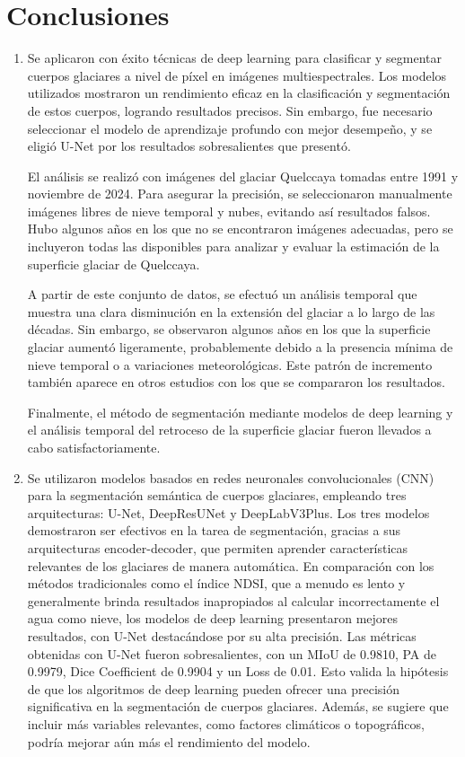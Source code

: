 \chapter{Conclusiones}
\doublespacing

\begin{enumerate}
	\item Se aplicaron con éxito técnicas de deep learning para clasificar y segmentar cuerpos glaciares a nivel de píxel en imágenes multiespectrales. Los modelos utilizados mostraron un rendimiento eficaz en la clasificación y segmentación de estos cuerpos, logrando resultados precisos. Sin embargo, fue necesario seleccionar el modelo de aprendizaje profundo con mejor desempeño, y se eligió U-Net por los resultados sobresalientes que presentó.
	
	El análisis se realizó con imágenes del glaciar Quelccaya tomadas entre 1991 y noviembre de 2024. Para asegurar la precisión, se seleccionaron manualmente imágenes libres de nieve temporal y nubes, evitando así resultados falsos. Hubo algunos años en los que no se encontraron imágenes adecuadas, pero se incluyeron todas las disponibles para analizar y evaluar la estimación de la superficie glaciar de Quelccaya.
	
	A partir de este conjunto de datos, se efectuó un análisis temporal que muestra una clara disminución en la extensión del glaciar a lo largo de las décadas. Sin embargo, se observaron algunos años en los que la superficie glaciar aumentó ligeramente, probablemente debido a la presencia mínima de nieve temporal o a variaciones meteorológicas. Este patrón de incremento también aparece en otros estudios con los que se compararon los resultados.
	
	Finalmente, el método de segmentación mediante modelos de deep learning y el análisis temporal del retroceso de la superficie glaciar fueron llevados a cabo satisfactoriamente.
	
	\item Se utilizaron modelos basados en redes neuronales convolucionales (CNN) para la segmentación semántica de cuerpos glaciares, empleando tres arquitecturas: U-Net, DeepResUNet y DeepLabV3Plus. Los tres modelos demostraron ser efectivos en la tarea de segmentación, gracias a sus arquitecturas encoder-decoder, que permiten aprender características relevantes de los glaciares de manera automática. En comparación con los métodos tradicionales como el índice NDSI, que a menudo es lento y generalmente brinda resultados inapropiados al calcular incorrectamente el agua como nieve, los modelos de deep learning presentaron mejores resultados, con U-Net destacándose por su alta precisión. Las métricas obtenidas con U-Net fueron sobresalientes, con un MIoU de 0.9810, PA de 0.9979, Dice Coefficient de 0.9904 y un Loss de 0.01. Esto valida la hipótesis de que los algoritmos de deep learning pueden ofrecer una precisión significativa en la segmentación de cuerpos glaciares. Además, se sugiere que incluir más variables relevantes, como factores climáticos o topográficos, podría mejorar aún más el rendimiento del modelo.
	

\end{enumerate}
